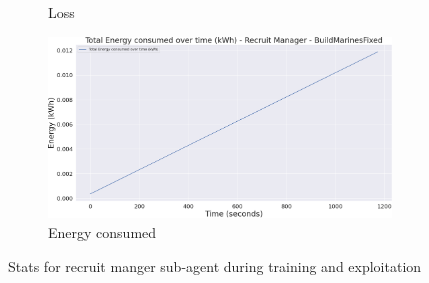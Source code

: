\begin{figure}[h]
\begin{subfigure}[b]{0.495\textwidth}
        \caption{Loss}
    \end{subfigure}
    \begin{subfigure}[b]{0.495\textwidth}
        \includegraphics[width=1\textwidth]{figs/multi_dqn_army_recruit_manager/energy_consumed.png}
        \caption{Energy consumed}
    \end{subfigure}
    \caption{Stats for recruit manger sub-agent during training and exploitation}
\end{figure}

